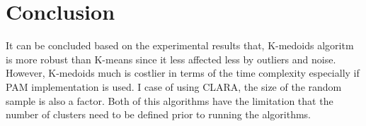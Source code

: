 \documentclass[12pt]{article}
\begin{document}
\section{Conclusion}
It can be concluded based on the experimental results that, K-medoids algoritm is more robust than K-means since it less affected less by outliers and noise. However, K-medoids much is costlier in terms of the time complexity especially if PAM implementation is used. I case of using CLARA, the size of the random sample is also a factor. Both of this algorithms have the limitation that the number of clusters need to be defined prior to running the algorithms.
\end{document}
